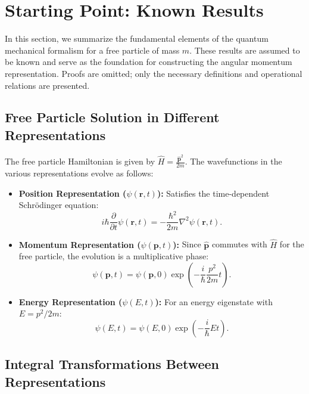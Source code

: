 \section{Starting Point: Known Results}

In this section, we summarize the fundamental elements of the quantum mechanical formalism for a free particle of mass $m$. These results are assumed to be known and serve as the foundation for constructing the angular momentum representation. Proofs are omitted; only the necessary definitions and operational relations are presented.

\subsection{Free Particle Solution in Different Representations}

The free particle Hamiltonian is given by $\hat{H} = \frac{\hat{\mathbf{p}}^2}{2m}$. The wavefunctions in the various representations evolve as follows:

\begin{itemize}
    \item \textbf{Position Representation ($\psi(\mathbf{r}, t)$):}
    Satisfies the time-dependent Schrödinger equation:
    \begin{equation}
        i\hbar \frac{\partial}{\partial t}\psi(\mathbf{r},t) = -\frac{\hbar^2}{2m}\nabla^2\psi(\mathbf{r},t).
    \end{equation}
    
    \item \textbf{Momentum Representation ($\psi(\mathbf{p}, t)$):}
    Since $\hat{\mathbf{p}}$ commutes with $\hat{H}$ for the free particle, the evolution is a multiplicative phase:
    \begin{equation}
        \psi(\mathbf{p},t) = \psi(\mathbf{p},0) \exp\left(-\frac{i}{\hbar}\frac{p^2}{2m}t\right).
    \end{equation}
    
    \item \textbf{Energy Representation ($\psi(E, t)$):}
    For an energy eigenstate with $E = p^2/2m$:
    \begin{equation}
        \psi(E,t) = \psi(E,0) \exp\left(-\frac{i}{\hbar}Et\right).
    \end{equation}
\end{itemize}

\subsection{Integral Transformations Between Representations}

